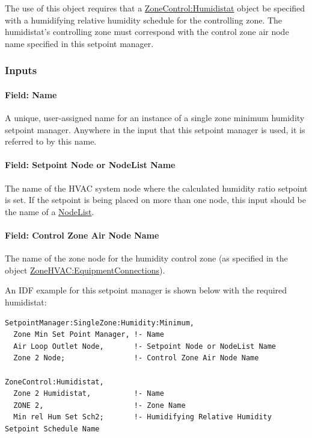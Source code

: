 The use of this object requires that a \hyperref[zonecontrolhumidistat]{ZoneControl:Humidistat} object be specified with a humidifying relative humidity schedule for the controlling zone. The humidistat's controlling zone must correspond with the control zone air node name specified in this setpoint manager.

\subsubsection{Inputs}\label{inputs-6-024}

\paragraph{Field: Name}\label{field-name-6-020}

A unique, user-assigned name for an instance of a single zone minimum humidity setpoint manager. Anywhere in the input that this setpoint manager is used, it is referred to by this name.

\paragraph{Field: Setpoint Node or NodeList Name}\label{field-setpoint-node-or-nodelist-name-6}

The name of the HVAC system node where the calculated humidity ratio setpoint is set. If the setpoint is being placed on more than one node, this input should be the name of a \hyperref[nodelist]{NodeList}.

\paragraph{Field: Control Zone Air Node Name}\label{field-control-zone-air-node-name}

The name of the zone node for the humidity control zone (as specified in the object \hyperref[zonehvacequipmentconnections]{ZoneHVAC:EquipmentConnections}).

An IDF example for this setpoint manager is shown below with the required humidistat:

\begin{lstlisting}
SetpointManager:SingleZone:Humidity:Minimum,
  Zone Min Set Point Manager, !- Name
  Air Loop Outlet Node,       !- Setpoint Node or NodeList Name
  Zone 2 Node;                !- Control Zone Air Node Name

ZoneControl:Humidistat,
  Zone 2 Humidistat,          !- Name
  ZONE 2,                     !- Zone Name
  Min rel Hum Set Sch2;       !- Humidifying Relative Humidity Setpoint Schedule Name
\end{lstlisting}

